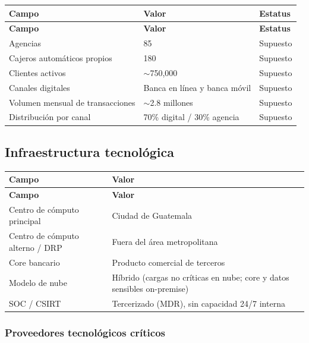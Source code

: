 \documentclass[11pt,a4paper]{article}
\begin{document}
	\begin{longtable}{@{}p{6.5cm}p{5cm}p{3cm}@{}}
		\toprule
		\textbf{Campo} & \textbf{Valor} & \textbf{Estatus} \\ \midrule
		\endfirsthead
		\toprule
		\textbf{Campo} & \textbf{Valor} & \textbf{Estatus} \\ \midrule
		\endhead
		Agencias & 85 & Supuesto \\
		Cajeros automáticos propios & 180 & Supuesto \\
		Clientes activos & $\sim$750,000 & Supuesto \\
		Canales digitales & Banca en línea y banca móvil & Supuesto \\
		Volumen mensual de transacciones & $\sim$2.8 millones & Supuesto \\
		Distribución por canal & 70\% digital / 30\% agencia & Supuesto \\
		\bottomrule
	\end{longtable}
	
	\subsection{Infraestructura tecnológica}
	
	\begin{longtable}{@{}p{6cm}p{8cm}@{}}
		\toprule
		\textbf{Campo} & \textbf{Valor} \\ \midrule
		\endfirsthead
		\toprule
		\textbf{Campo} & \textbf{Valor} \\ \midrule
		\endhead
		Centro de cómputo principal & Ciudad de Guatemala \\
		Centro de cómputo alterno / DRP & Fuera del área metropolitana \\
		Core bancario & Producto comercial de terceros \\
		Modelo de nube & Híbrido (cargas no críticas en nube; core y datos sensibles on-premise) \\
		SOC / CSIRT & Tercerizado (MDR), sin capacidad 24/7 interna \\
		\bottomrule
	\end{longtable}
	
	\vspace{1cm}
	
	\subsubsection*{Proveedores tecnológicos críticos}
	
\end{document}

